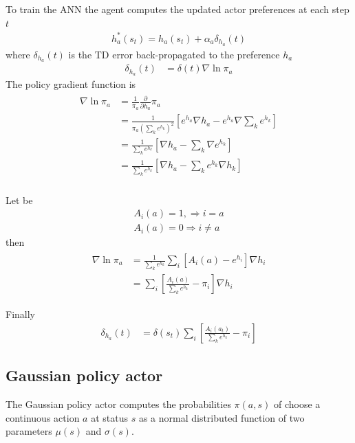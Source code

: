 \documentclass[]{article}
\begin{document}
To train the ANN the agent computes the updated actor preferences at each step $ t $
\begin{align}
h^*_a(s_t) = h_a(s_t) + \alpha_a \delta_{h_a}(t) 
\end{align}
where $ \delta_{h_a}(t) $ is the TD error back-propagated to the preference $ h_a $ 
\begin{align*}
\delta_{h_a}(t)&	= \delta(t) \nabla \ln \pi_a
\end{align*}
The policy gradient function is
\begin{align*}
\begin{split}
	\nabla \ln \pi_a& = \frac{1}{\pi_a}
	\frac{\partial}{\partial h_a} \pi_a
	\\
	& = \frac{1}{\pi_a ( \sum_k e^{h_k} )^2}
	\left[
		e^{h_a} \nabla h_a - e^{h_a} \nabla \sum_k e^{h_k}
	\right]
	\\
	& = \frac{1} { \sum_k e^{h_k}}
	\left[
		\nabla h_a - \sum_k \nabla e^{h_k}
	\right]
	\\
	& = \frac{1} { \sum_k e^{h_k}}
	\left[
		\nabla h_a - \sum_k e^{h_k} \nabla h_k
	\right]
	\\
\end{split}
\end{align*}

Let be
\begin{align*}
	A_i(a) = 1, \Rightarrow i = a 
	\\
	A_i(a) = 0 \Rightarrow i \ne a 
\end{align*}
then
\begin{align*}
\begin{split}
	\nabla \ln \pi_a& = \frac{1}{\sum_k e^{h_k}} \sum_i
	\left[
		A_i(a) - e^{h_i} 
	\right] \nabla h_i
	\\
	& = \sum_i
	\left[ \frac{ A_i(a)}{\sum_k e^{h_k}} - \pi_i
	\right] \nabla h_i
\end{split}
\end{align*}

Finally
\begin{align}
\delta_{h_a}(t)&	= \delta(s_t) \sum_i \left[
\frac{A_i(a_t)}{\sum_k e^{h_k}} - \pi_i
\right]
\end{align}

\subsection{Gaussian policy actor}

The Gaussian policy actor computes the probabilities $ \pi(a, s) $ of choose a continuous action $ a $ at status $ s $ as a normal distributed function of two parameters $ \mu(s) $ and $ \sigma(s) $.
\end{document}
